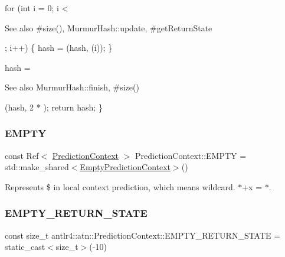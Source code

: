 \begin{DoxyPre}     for (int i = 0; i < \begin{DoxySeeAlso}{See also}
#size(), MurmurHash::update, #getReturnState


\end{DoxySeeAlso}
; i++) \{
         hash = (hash, (i));
     \}\end{DoxyPre}



\begin{DoxyPre}     hash = \begin{DoxySeeAlso}{See also}
MurmurHash::finish, #size()


\end{DoxySeeAlso}
(hash, 2 * );
     return hash;
 \}
\end{DoxyPre}
 \mbox{\label{classantlr4_1_1atn_1_1PredictionContext_a274e7f1ed300832110b4f7b85e0dd1c4}} 
\subsubsection{\texorpdfstring{E\+M\+P\+TY}{EMPTY}}
{\footnotesize\ttfamily const Ref$<$ \hyperlink{classantlr4_1_1atn_1_1PredictionContext}{Prediction\+Context} $>$ Prediction\+Context\+::\+E\+M\+P\+TY = std\+::make\+\_\+shared$<$\hyperlink{classantlr4_1_1atn_1_1EmptyPredictionContext}{Empty\+Prediction\+Context}$>$()\hspace{0.3cm}{\ttfamily [static]}}

Represents \$ in local context prediction, which means wildcard. $\ast$+x = $\ast$. \mbox{\label{classantlr4_1_1atn_1_1PredictionContext_af62e1e5dfe54ff75f0c361c62dd1910b}} 
\subsubsection{\texorpdfstring{E\+M\+P\+T\+Y\+\_\+\+R\+E\+T\+U\+R\+N\+\_\+\+S\+T\+A\+TE}{EMPTY\_RETURN\_STATE}}
{\footnotesize\ttfamily const size\+\_\+t antlr4\+::atn\+::\+Prediction\+Context\+::\+E\+M\+P\+T\+Y\+\_\+\+R\+E\+T\+U\+R\+N\+\_\+\+S\+T\+A\+TE = static\+\_\+cast$<$size\+\_\+t$>$(-\/10)\hspace{0.3cm}{\ttfamily [static]}}

